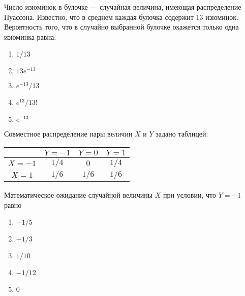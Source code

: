 \documentclass[t]{beamer}
\begin{document}
 \begin{frame} \label{12} 
\begin{block}{12} 

Число изюминок в булочке — случайная величина, имеющая распределение Пуассона. Известно, что в среднем каждая булочка содержит 13 изюминок. Вероятность того, что в случайно выбранной булочке окажется только одна изюминка равна:
 


 \end{block} 
\begin{enumerate} 
\item[] \hyperlink{12-No}{\beamergotobutton{} $1/13$}
\item[] \hyperlink{12-Yes}{\beamergotobutton{} $13e^{-13}$}
\item[] \hyperlink{12-No}{\beamergotobutton{} $e^{-13}/13$}
\item[] \hyperlink{12-No}{\beamergotobutton{} $e^{13}/13!$}
\item[] \hyperlink{12-No}{\beamergotobutton{} $e^{-13}$}
\end{enumerate} 
\end{frame} 


 \begin{frame} \label{13} 
\begin{block}{13} 

Совместное распределение пары величин $X$ и $Y$ задано таблицей:
\begin{center}
\begin{tabular}{@{}c|ccc@{}}
\toprule
       & $Y=-1$ & $Y=0$ & $Y=1$ \\ \midrule
$X=-1$ & $1/4$  & $0$   & $1/4$ \\
$X=1$  & $1/6$  & $1/6$ & $1/6$ \\ \bottomrule
\end{tabular}
\end{center}

\vspace{0.5cm} 
 
 
Математическое ожидание случайной величины $X$ при условии, что $Y=-1$ равно
 


 \end{block} 
\begin{enumerate} 
\item[] \hyperlink{13-Yes}{\beamergotobutton{} $-1/5$}
\item[] \hyperlink{13-No}{\beamergotobutton{} $-1/3$}
\item[] \hyperlink{13-No}{\beamergotobutton{} $1/10$
}
\item[] \hyperlink{13-No}{\beamergotobutton{} $-1/12$}
\item[] \hyperlink{13-No}{\beamergotobutton{} $0$}
\end{enumerate} 
\end{frame} 
\end{document}
